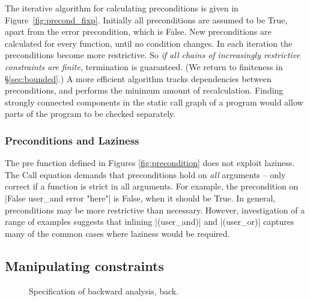 \documentclass[preprint]{sigplanconf}
\newcommand{\C}[1]{\textsf{#1}}
\begin{document}
The iterative algorithm for calculating preconditions is given in Figure~\ref{fig:precond_fixp}.
Initially all preconditions are assumed to be True, apart from the \C{error} precondition, which is False. New preconditions are calculated for every function, until no condition changes. In each iteration the preconditions become more restrictive. So \textit{if all chains of increasingly restrictive constraints are finite}, termination is guaranteed. (We return to finiteness in \S\ref{sec:bounded}.) A more efficient algorithm tracks dependencies between preconditions, and performs the minimum amount of recalculation. Finding strongly connected components in the static call graph of a program would allow parts of the program to be checked separately.

\subsubsection{Preconditions and Laziness}

The \C{pre} function defined in Figures \ref{fig:precondition} does not exploit laziness. The \C{Call} equation demands that preconditions hold on \textit{all} arguments -- only correct if a function is strict in all arguments. For example, the precondition on |False user_and error "here"| is False, when it should be True. In general, preconditions may be more restrictive than necessary. However, investigation of a range of examples suggests that inlining |(user_and)| and |(user_or)| captures many of the common cases where laziness would be required.


\subsection{Manipulating constraints}
\label{sec:backward}

\begin{figure}
\caption{Specification of backward analysis, \C{back}.}
\label{fig:backward}
\end{figure}
\end{document}
